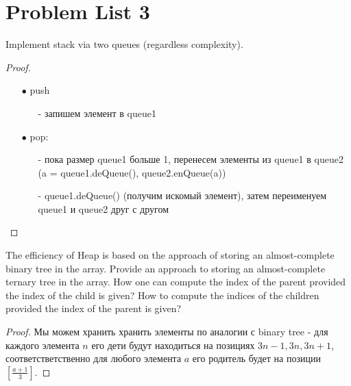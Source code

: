 \section{Problem List 3}

\begin{prob}
Implement stack via two queues (regardless complexity).
\end{prob}
\vskip 0.2in
\begin{proof}
\begin{itemize}
\item[]
\item[$\bullet$] push
    \begin{itemize}
        \item[-] запишем элемент в queue1
    \end{itemize}
\item[$\bullet$] pop:
    \begin{itemize}
        \item[-]  пока размер queue1 больше 1, перенесем элементы из queue1 в queue2 (a = queue1.deQueue(), queue2.enQueue(a))
        \item[-]  queue1.deQueue() (получим искомый элемент), затем переименуем queue1 и queue2 друг с другом
    \end{itemize}
\end{itemize}
\end{proof}
\vskip 0.6in




\begin{prob}
The efficiency of Heap is based on the approach of storing an almost-complete binary tree in the array. Provide an approach to storing an almost-complete ternary tree in the array. How one can compute the index of the parent provided the index of the child is given? How to compute the indices of the children provided the index of the parent is given?
\end{prob}
\vskip 0.2in
\begin{proof}
Мы можем хранить хранить элементы по аналогии с binary tree - для каждого элемента $n$ его дети будут находиться на позициях $3n-1, 3n, 3n+1$, соответстветственно для любого элемента $a$ его родитель будет на позиции $\left[ \frac{a+1}{3} \right]$.
\end{proof}
\vskip 0.6in




